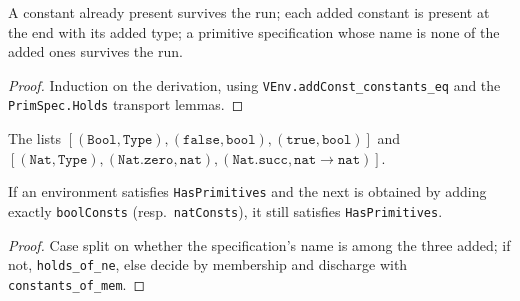 \begin{lemma}
\label{vpc:lem:addsconsts-lemmas}
\leanok
{}

 A constant already present survives the run; each added constant is present at
the end with its added type; a primitive specification whose name is none of the added ones
survives the run.
\end{lemma}
\begin{proof}\leanok
{}
 Induction on the derivation, using \texttt{VEnv.addConst\_constants\_eq} and the
\texttt{PrimSpec.Holds} transport lemmas.
\end{proof}

\begin{definition}
\label{vpc:def:bool-nat-consts}
\leanok
{}

 The lists
$[(\mathtt{Bool},\mathtt{Type}),(\mathtt{false},\mathtt{bool}),(\mathtt{true},\mathtt{bool})]$
and $[(\mathtt{Nat},\mathtt{Type}),(\mathtt{Nat.zero},\mathtt{nat}),(\mathtt{Nat.succ},\mathtt{nat}
\to \mathtt{nat})]$.
\end{definition}

\begin{lemma}
\label{vpc:thm:addsconsts-hasprimitives}
\leanok
{}

 If an environment satisfies \texttt{HasPrimitives} and the next is obtained by
adding exactly \texttt{boolConsts} (resp.\ \texttt{natConsts}), it still satisfies
\texttt{HasPrimitives}.
\end{lemma}
\begin{proof}\leanok
{}
 Case split on whether the specification's name is among the three added; if not,
\texttt{holds\_of\_ne}, else decide by membership and discharge with
\texttt{constants\_of\_mem}.
\end{proof}

